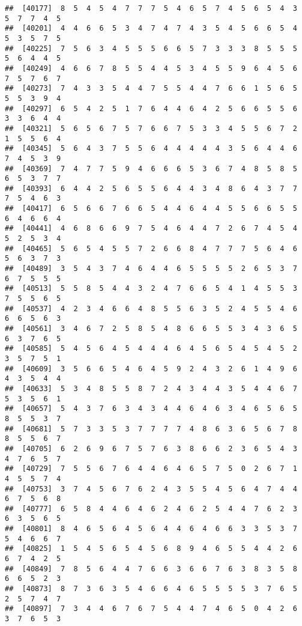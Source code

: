 \documentclass[
]{book}
\begin{document}
\begin{verbatim}
##  [40177]  8  5  4  5  4  7  7  7  5  4  6  5  7  4  5  6  5  4  3  5  7  7  4  5
##  [40201]  4  4  6  6  5  3  4  7  4  7  4  3  5  4  5  6  6  5  4  5  3  5  7  5
##  [40225]  7  5  6  3  4  5  5  5  6  6  5  7  3  3  3  8  5  5  5  5  6  4  4  5
##  [40249]  4  6  6  7  8  5  5  4  4  5  3  4  5  5  9  6  4  5  6  7  5  7  6  7
##  [40273]  7  4  3  3  5  4  4  7  5  5  4  4  7  6  6  1  5  6  5  5  5  3  9  4
##  [40297]  6  5  4  2  5  1  7  6  4  4  6  4  2  5  6  6  5  5  6  3  3  6  4  4
##  [40321]  5  6  5  6  7  5  7  6  6  7  5  3  3  4  5  5  6  7  2  1  5  5  6  4
##  [40345]  5  6  4  3  7  5  5  6  4  4  4  4  4  3  5  6  4  4  6  7  4  5  3  9
##  [40369]  7  4  7  7  5  9  4  6  6  6  5  3  6  7  4  8  5  8  5  6  5  3  7  7
##  [40393]  6  4  4  2  5  6  5  5  6  4  4  3  4  8  6  4  3  7  7  7  5  4  6  3
##  [40417]  6  5  6  6  7  6  6  5  4  4  6  4  4  5  5  6  6  5  5  6  4  6  6  4
##  [40441]  4  6  8  6  6  9  7  5  4  6  4  4  7  2  6  7  4  5  4  5  2  5  3  4
##  [40465]  5  6  5  4  5  5  7  2  6  6  8  4  7  7  7  5  6  4  6  5  6  3  7  3
##  [40489]  3  5  4  3  7  4  6  4  4  6  5  5  5  5  2  6  5  3  7  6  7  5  5  5
##  [40513]  5  5  8  5  4  4  3  2  4  7  6  6  5  4  1  4  5  5  3  7  5  5  6  5
##  [40537]  4  2  3  4  6  6  4  8  5  5  6  3  5  2  4  5  5  4  6  6  6  5  6  3
##  [40561]  3  4  6  7  2  5  8  5  4  8  6  6  5  5  3  4  3  6  5  6  3  7  6  5
##  [40585]  5  4  5  6  4  5  4  4  4  6  4  5  6  5  4  5  4  5  2  3  5  7  5  1
##  [40609]  3  5  6  6  5  4  6  4  5  9  2  4  3  2  6  1  4  9  6  4  3  5  4  4
##  [40633]  5  3  4  8  5  5  8  7  2  4  3  4  4  3  5  4  4  6  7  5  3  5  6  1
##  [40657]  5  4  3  7  6  3  4  3  4  4  6  4  6  3  4  6  5  6  5  8  5  5  3  7
##  [40681]  5  7  3  3  5  3  7  7  7  7  4  8  6  3  6  5  6  7  8  8  5  5  6  7
##  [40705]  6  2  6  9  6  7  5  7  6  3  8  6  6  2  3  6  5  4  3  4  7  6  5  7
##  [40729]  7  5  5  6  7  6  4  4  6  4  6  5  7  5  0  2  6  7  1  4  5  5  7  4
##  [40753]  3  7  4  5  6  7  6  2  4  3  5  5  4  5  6  4  7  4  4  6  7  5  6  8
##  [40777]  6  5  8  4  4  6  4  6  2  4  6  2  5  4  4  7  6  2  3  6  3  5  6  5
##  [40801]  8  4  6  5  6  4  5  6  4  4  6  4  6  6  3  3  5  3  7  5  4  6  6  7
##  [40825]  1  5  4  5  6  5  4  5  6  8  9  4  6  5  5  4  4  2  6  6  7  4  2  5
##  [40849]  7  8  5  6  4  4  7  6  6  3  6  6  7  6  3  8  3  5  8  6  6  5  2  3
##  [40873]  8  7  3  6  3  5  4  6  6  4  6  5  5  5  5  3  7  6  5  2  5  7  4  7
##  [40897]  7  3  4  4  6  7  6  7  5  4  4  7  4  6  5  0  4  2  6  3  7  6  5  3

\end{verbatim}
\end{document}
